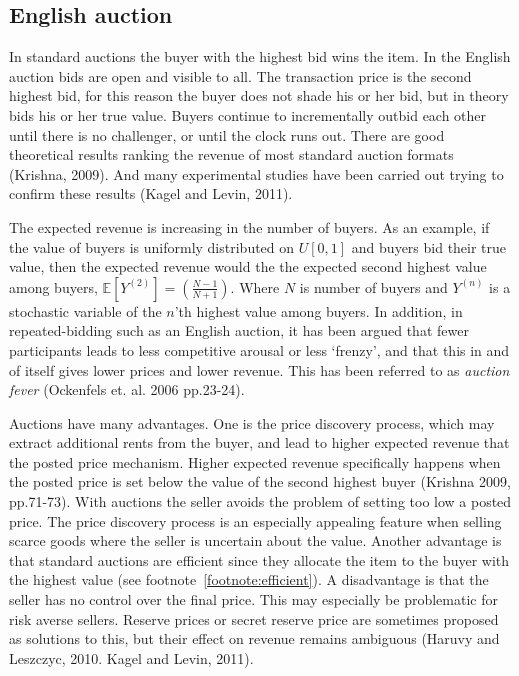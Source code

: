 \documentclass[a4paper,12pt]{article}
\begin{document}
	\subsection{English auction}

	In standard auctions the buyer with the highest bid wins the item. In the English auction bids are open and visible to all. The transaction price is the second highest bid, for this reason the buyer does not shade his or her bid, but in theory bids his or her true value. Buyers continue to incrementally outbid each other until there is no challenger, or until the clock runs out.  There are good theoretical results ranking the revenue of most standard auction formats (Krishna, 2009). And many experimental studies have been carried out trying to confirm these results (Kagel and Levin, 2011). 

	The expected revenue is increasing in the number of buyers. As an example, if the value of buyers is uniformly distributed on $U[0,1]$ and buyers bid their true value, then the expected revenue would the the expected second highest value among buyers, $\mathbb{E}[Y^{(2)}] = (\frac{N-1}{N+1})$. Where $N$ is number of buyers and $Y^{(n)}$ is a stochastic variable of the $n$'th highest value among buyers. In addition, in repeated-bidding such as an English auction, it has been argued that fewer participants leads to less competitive arousal or less `frenzy', and that this in and of itself gives lower prices and lower revenue. This has been referred to as \emph{auction fever} (Ockenfels et. al. 2006 pp.23-24). 


	Auctions have many advantages. One is the price discovery process, which may extract additional rents from the buyer, and lead to higher expected revenue that the posted price mechanism. Higher expected revenue specifically happens when the posted price is set below the value of the second highest buyer (Krishna 2009, pp.71-73). With auctions the seller avoids the problem of setting too low a posted price. The price discovery process is an especially appealing feature when selling scarce goods where the seller is uncertain about the value. Another advantage is that standard auctions are efficient since they allocate the item to the buyer with the highest value (see footnote~\ref{footnote:efficient}). A disadvantage is that the seller has no control over the final price. This may especially be problematic for risk averse sellers. Reserve prices or secret reserve price are sometimes proposed as solutions to this, but their effect on revenue remains ambiguous (Haruvy and Leszczyc, 2010. Kagel and Levin, 2011).
\end{document}
